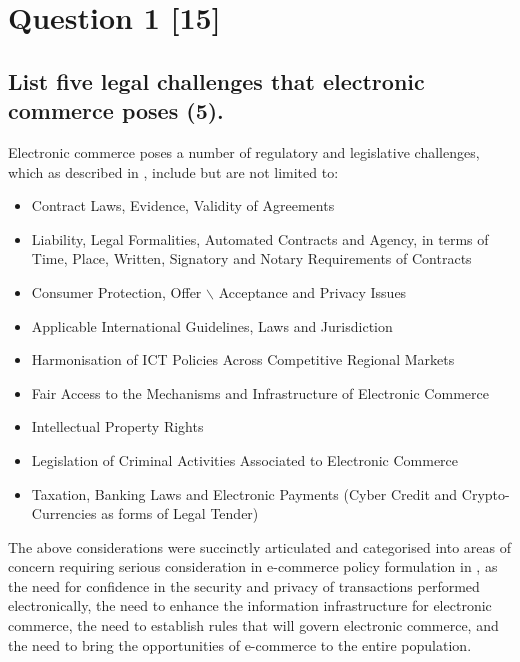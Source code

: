 \documentclass[11pt]{article}
\begin{document}
\section{Question 1 [15]}
\label{sec:org02889b0}
\subsection{List five legal challenges that electronic commerce poses (5).}
\label{sec:org1a53eca}

Electronic commerce poses a number of regulatory and legislative challenges,
which as described in
\cite{rsa02_elect_comm_trans_act,rsa12_elect_comm_trans_amend_bill,eiselen16_ecomm,papadopoulus12_intro_cyberlaw,buys00_towards_ecomm_policy_sa,pistorius16_copyright_law_it,hamann14_direct_marketing_and_spam_via_ecomms,pistorius16_domain_names_infringe_tm}, include but are
not limited to:

\begin{itemize}
\item Contract Laws, Evidence, Validity of Agreements
\item Liability, Legal Formalities, Automated Contracts and Agency, in terms of
Time, Place, Written, Signatory and Notary Requirements of Contracts
\item Consumer Protection, Offer $\backslash$ Acceptance and Privacy Issues
\item Applicable International Guidelines, Laws and Jurisdiction
\item Harmonisation of ICT Policies Across Competitive Regional Markets
\item Fair Access to the Mechanisms and Infrastructure of Electronic Commerce
\item Intellectual Property Rights
\item Legislation of Criminal Activities Associated to Electronic Commerce
\item Taxation, Banking Laws and Electronic Payments (Cyber Credit and
Crypto-Currencies as forms of Legal Tender)
\end{itemize}

The above considerations were succinctly articulated and categorised into areas
of concern requiring serious consideration in e-commerce policy formulation in
\cite{rsa00_green_paper_ecomm_sa}, as the need for confidence in the security and
privacy of transactions performed electronically, the need to enhance the
information infrastructure for electronic commerce, the need to establish rules
that will govern electronic commerce, and the need to bring the opportunities of
e-commerce to the entire population.
\end{document}
